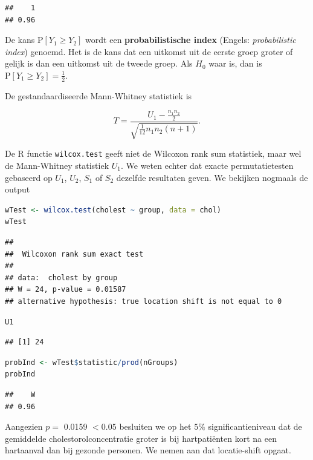 \documentclass[
  12pt,dutch,coursenotes]{book}
\newcommand{\passthrough}[1]{#1}
\begin{document}
\begin{lstlisting}
##    1 
## 0.96
\end{lstlisting}

De kans \(\text{P}\left[Y_1 \geq Y_2\right]\) wordt een \textbf{probabilistische index} (Engels: \emph{probabilistic index}) genoemd.
Het is de kans dat een uitkomst uit de eerste groep groter of gelijk is dan een uitkomst uit de tweede groep.
Als \(H_0\) waar is, dan is \(\text{P}\left[Y_1 \geq Y_2\right]=\frac{1}{2}\).

De gestandaardiseerde Mann-Whitney statistiek is

\[
  T = \frac{U_1 - \frac{n_1n_2}{2}}{\sqrt{\frac{1}{12}n_1n_2(n+1)}}.
\]

De R functie \passthrough{\lstinline!wilcox.test!} geeft niet de Wilcoxon rank sum statistiek, maar wel de Mann-Whitney statistiek \(U_1\).
We weten echter dat exacte permutatietesten gebaseerd op \(U_1\), \(U_2\), \(S_1\) of \(S_2\) dezelfde resultaten geven.
We bekijken nogmaals de output

\begin{lstlisting}[language=R]
wTest <- wilcox.test(cholest ~ group, data = chol)
wTest
\end{lstlisting}

\begin{lstlisting}
## 
##  Wilcoxon rank sum exact test
## 
## data:  cholest by group
## W = 24, p-value = 0.01587
## alternative hypothesis: true location shift is not equal to 0
\end{lstlisting}

\begin{lstlisting}[language=R]
U1
\end{lstlisting}

\begin{lstlisting}
## [1] 24
\end{lstlisting}

\begin{lstlisting}[language=R]
probInd <- wTest$statistic/prod(nGroups)
probInd
\end{lstlisting}

\begin{lstlisting}
##    W 
## 0.96
\end{lstlisting}

Aangezien \(p=\) 0.0159 \(<0.05\) besluiten we op het \(5\%\) significantieniveau dat de gemiddelde cholestorolconcentratie groter is bij hartpatiënten kort na een hartaanval dan bij gezonde personen. We nemen aan dat locatie-shift opgaat.
\end{document}
